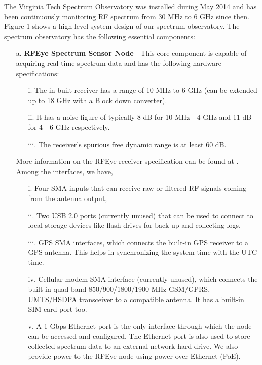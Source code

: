\documentclass[12pt,sts]{report}
\begin{document}
The Virginia Tech Spectrum Observatory was installed during May 2014 and has been continuously monitoring RF spectrum from 30 MHz to 6 GHz since then. Figure 1 shows a high level system design of our spectrum observatory. The spectrum observatory has the following essential components:
\begin{enumerate}
	\item[a.] \textbf{RFEye Spectrum Sensor Node} - This core component is capable of acquiring real-time spectrum data and has the following hardware specifications:
	\begin{enumerate}
		\item[i.] The in-built receiver has a range of 10 MHz to 6 GHz (can be extended up to 18 GHz with a Block down converter).
		\item[ii.] It has a noise figure of typically 8 dB for 10 MHz - 4 GHz and 11 dB for 4 - 6 GHz respectively.
		\item[iii.] The receiver's spurious free dynamic range is at least 60 dB.
	\end{enumerate}
	More information on the RFEye receiver specification can be found at \cite{rfeye_specs}.
	Among the interfaces, we have, 
	\begin{enumerate}
		\item[i.] Four SMA inputs that can receive raw or filtered RF signals coming from the antenna output, 
		\item[ii.] Two USB  2.0 ports (currently unused) that can be used to connect to local storage devices like flash drives for back-up and collecting logs, 
		\item[iii.] GPS SMA interfaces, which connects the built-in GPS receiver to a GPS antenna. This helps in synchronizing the system time with the UTC time.
		\item[iv.] Cellular modem SMA interface (currently unused), which connects the built-in quad-band 850/900/1800/1900 MHz GSM/GPRS, UMTS/HSDPA transceiver to a compatible antenna. It has a built-in SIM card port too.
		\item[v.] A 1 Gbps Ethernet port is the only interface through which the node can be accessed and configured. The Ethernet port is also used to store collected spectrum data to an external network hard drive. We also provide power to the RFEye node using power-over-Ethernet (PoE).
	\end{enumerate}
	

\end{enumerate}
\end{document}
